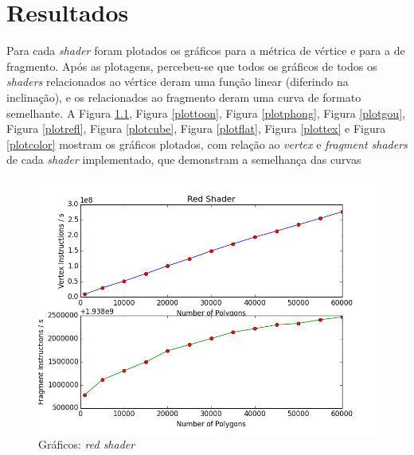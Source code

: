 \chapter[Resultados]{Resultados}

	Para cada \textit{shader} foram plotados os gráficos para a métrica de vértice e para a de fragmento. Após as plotagens, percebeu-se que todos os gráficos de todos os \textit{shaders} relacionados ao vértice deram uma função linear (diferindo na inclinação), e os relacionados ao fragmento deram uma curva de formato semelhante. A Figura \ref{plotred}, Figura \ref{plottoon}, Figura \ref{plotphong}, Figura \ref{plotgou}, Figura \ref{plotrefl}, Figura \ref{plotcube}, Figura \ref{plotflat}, Figura \ref{plottex} e Figura \ref{plotcolor}  mostram os gráficos plotados, com relação ao \textit{vertex} e \textit{fragment shaders} de cada \textit{shader} implementado, que demonstram a semelhança das curvas

	\begin{figure}[h]
	\centering
		\includegraphics[keepaspectratio=true,scale=0.6]{figuras/red.png}
	\caption{Gráficos: \textit{red shader}}
	\label{plotred}
	\end{figure}
 

